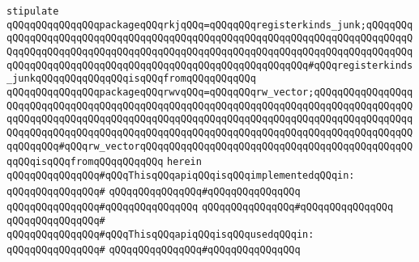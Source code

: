 \newline
\verb|stipulate|\newline
\verb|qQQqqQQqqQQqqQQqpackageqQQqrkjqQQq=qQQqqQQqregisterkinds_junk;qQQqqQQqqQQqqQQqqQQqqQQqqQQqqQQqqQQqqQQqqQQqqQQqqQQqqQQqqQQqqQQqqQQqqQQqqQQqqQQqqQQqqQQqqQQqqQQqqQQqqQQqqQQqqQQqqQQqqQQqqQQqqQQqqQQqqQQqqQQqqQQqqQQqqQQqqQQqqQQqqQQqqQQqqQQqqQQqqQQqqQQqqQQqqQQqqQQqqQQq#qQQqregisterkinds_junkqQQqqQQqqQQqqQQqisqQQqfromqQQqqQQqqQQq|\newline
\verb|qQQqqQQqqQQqqQQqpackageqQQqrwvqQQq=qQQqqQQqrw_vector;qQQqqQQqqQQqqQQqqQQqqQQqqQQqqQQqqQQqqQQqqQQqqQQqqQQqqQQqqQQqqQQqqQQqqQQqqQQqqQQqqQQqqQQqqQQqqQQqqQQqqQQqqQQqqQQqqQQqqQQqqQQqqQQqqQQqqQQqqQQqqQQqqQQqqQQqqQQqqQQqqQQqqQQqqQQqqQQqqQQqqQQqqQQqqQQqqQQqqQQqqQQqqQQqqQQqqQQqqQQqqQQqqQQqqQQqqQQq#qQQqrw_vectorqQQqqQQqqQQqqQQqqQQqqQQqqQQqqQQqqQQqqQQqqQQqqQQqqQQqisqQQqfromqQQqqQQqqQQq|\newline
\verb|herein|\newline
\newline
\verb|qQQqqQQqqQQqqQQq#qQQqThisqQQqapiqQQqisqQQqimplementedqQQqin:|\newline
\verb|qQQqqQQqqQQqqQQq#|\newline
\verb|qQQqqQQqqQQqqQQq#qQQqqQQqqQQqqQQq|\newline
\verb|qQQqqQQqqQQqqQQq#qQQqqQQqqQQqqQQq|\newline
\verb|qQQqqQQqqQQqqQQq#qQQqqQQqqQQqqQQq|\newline
\verb|qQQqqQQqqQQqqQQq#|\newline
\verb|qQQqqQQqqQQqqQQq#qQQqThisqQQqapiqQQqisqQQqusedqQQqin:|\newline
\verb|qQQqqQQqqQQqqQQq#|\newline
\verb|qQQqqQQqqQQqqQQq#qQQqqQQqqQQqqQQq|\newline
